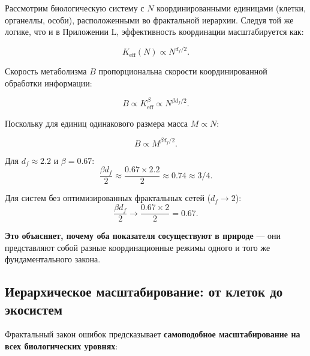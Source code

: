 \documentclass[12pt]{article}
\newcommand{\Keff}{K_{\mathrm{eff}}}
\begin{document}
	Рассмотрим биологическую систему с \(N\) координированными единицами (клетки, органеллы, особи), расположенными во фрактальной иерархии. Следуя той же логике, что и в Приложении L, эффективность координации масштабируется как:
	
	\begin{equation}
		\Keff(N) \propto N^{d_f/2}.
	\end{equation}
	
	Скорость метаболизма \(B\) пропорциональна скорости координированной обработки информации:
	
	\begin{equation}
		B \propto \Keff^{\beta} \propto N^{\beta d_f/2}.
	\end{equation}
	
	Поскольку для единиц одинакового размера масса \(M \propto N\):
	
	\begin{equation}
		B \propto M^{\beta d_f/2}.
	\end{equation}
	
	Для \(d_f \approx 2.2\) и \(\beta = 0.67\):
	\begin{equation}
		\frac{\beta d_f}{2} \approx \frac{0.67 \times 2.2}{2} \approx 0.74 \approx 3/4.
	\end{equation}
	
	Для систем без оптимизированных фрактальных сетей (\(d_f \to 2\)):
	\begin{equation}
		\frac{\beta d_f}{2} \to \frac{0.67 \times 2}{2} = 0.67.
	\end{equation}
	
	\textbf{Это объясняет, почему оба показателя сосуществуют в природе} — они представляют собой разные координационные режимы одного и того же фундаментального закона.
	
	\subsection{Иерархическое масштабирование: от клеток до экосистем}
	
	Фрактальный закон ошибок предсказывает \textbf{самоподобное масштабирование на всех биологических уровнях}:
	
\end{document}
